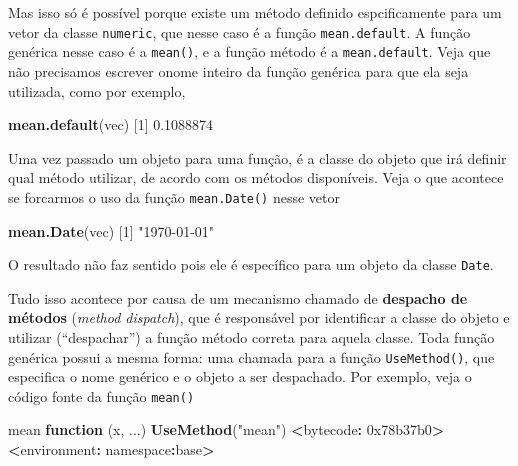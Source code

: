 \documentclass[10pt,a4paper]{book}
\newenvironment{Shaded}{\begin{snugshade}}{\end{snugshade}}
\newcommand{\KeywordTok}[1]{\textcolor[rgb]{0.13,0.29,0.53}{\textbf{#1}}}
\newcommand{\DecValTok}[1]{\textcolor[rgb]{0.00,0.00,0.81}{#1}}
\newcommand{\FloatTok}[1]{\textcolor[rgb]{0.00,0.00,0.81}{#1}}
\newcommand{\StringTok}[1]{\textcolor[rgb]{0.31,0.60,0.02}{#1}}
\newcommand{\ControlFlowTok}[1]{\textcolor[rgb]{0.13,0.29,0.53}{\textbf{#1}}}
\newcommand{\OperatorTok}[1]{\textcolor[rgb]{0.81,0.36,0.00}{\textbf{#1}}}
\newcommand{\ErrorTok}[1]{\textcolor[rgb]{0.64,0.00,0.00}{\textbf{#1}}}
\newcommand{\NormalTok}[1]{#1}
\begin{document}
Mas isso só é possível porque existe um método definido espcificamente
para um vetor da classe \texttt{numeric}, que nesse caso é a função
\texttt{mean.default}. A função genérica nesse caso é a \texttt{mean()},
e a função método é a \texttt{mean.default}. Veja que não precisamos
escrever onome inteiro da função genérica para que ela seja utilizada,
como por exemplo,

\begin{Shaded}
\begin{Highlighting}[]
\KeywordTok{mean.default}\NormalTok{(vec)}
\NormalTok{[}\DecValTok{1}\NormalTok{] }\FloatTok{0.1088874}
\end{Highlighting}
\end{Shaded}

Uma vez passado um objeto para uma função, é a classe do objeto que irá
definir qual método utilizar, de acordo com os métodos disponíveis. Veja
o que acontece se forcarmos o uso da função \texttt{mean.Date()} nesse
vetor

\begin{Shaded}
\begin{Highlighting}[]
\KeywordTok{mean.Date}\NormalTok{(vec)}
\NormalTok{[}\DecValTok{1}\NormalTok{] }\StringTok{"1970-01-01"}
\end{Highlighting}
\end{Shaded}

O resultado não faz sentido pois ele é específico para um objeto da
classe \texttt{Date}.

Tudo isso acontece por causa de um mecanismo chamado de \textbf{despacho
de métodos} (\emph{method dispatch}), que é responsável por identificar
a classe do objeto e utilizar (``despachar'') a função método correta
para aquela classe. Toda função genérica possui a mesma forma: uma
chamada para a função \texttt{UseMethod()}, que especifica o nome
genérico e o objeto a ser despachado. Por exemplo, veja o código fonte
da função \texttt{mean()}

\begin{Shaded}
\begin{Highlighting}[]
\NormalTok{mean}
\ControlFlowTok{function}\NormalTok{ (x, ...) }
\KeywordTok{UseMethod}\NormalTok{(}\StringTok{"mean"}\NormalTok{)}
\OperatorTok{<}\NormalTok{bytecode}\OperatorTok{:}\StringTok{ }\DecValTok{0x78b37b0}\OperatorTok{>}
\ErrorTok{<}\NormalTok{environment}\OperatorTok{:}\StringTok{ }\NormalTok{namespace}\OperatorTok{:}\NormalTok{base}\OperatorTok{>}
\end{Highlighting}
\end{Shaded}
\end{document}
